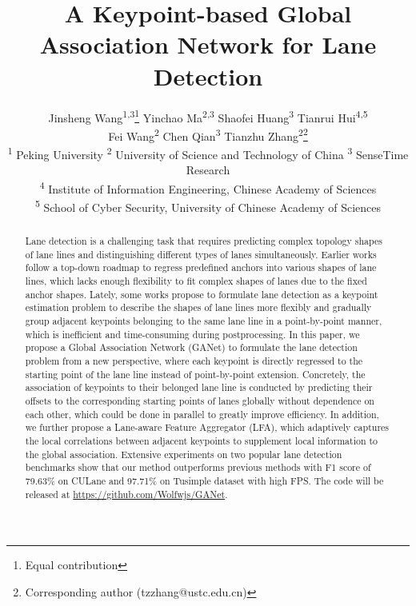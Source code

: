 \documentclass[10pt,twocolumn,letterpaper]{article}
\makeatletter
\newcommand{\printfnsymbol}[1]{\textsuperscript{\@fnsymbol{#1}}}
\makeatother
\begin{document}
\title{A Keypoint-based Global Association Network for Lane Detection}



\author{
Jinsheng Wang\textsuperscript{\rm 1,3}\thanks{Equal contribution} \quad Yinchao Ma\textsuperscript{\rm 2,3}\printfnsymbol{1} \quad Shaofei Huang\textsuperscript{\rm 3}\printfnsymbol{1} \quad Tianrui Hui\textsuperscript{\rm 4,5} \\ \quad Fei Wang\textsuperscript{\rm 2} 
\quad Chen Qian\textsuperscript{\rm3} \quad Tianzhu Zhang\textsuperscript{\rm 2}\thanks{Corresponding author (tzzhang@ustc.edu.cn)} \\
\textsuperscript{\rm 1} Peking University \quad \textsuperscript{\rm 2} University of Science and Technology of China \quad \textsuperscript{\rm 3} SenseTime Research  \\
\textsuperscript{\rm 4} Institute of Information Engineering, Chinese Academy of Sciences\\
\textsuperscript{\rm 5} School of Cyber Security, University of Chinese Academy of Sciences\\
}

\maketitle
\begin{abstract}
Lane detection is a challenging task that requires predicting complex topology shapes of lane lines and distinguishing different types of lanes simultaneously.
Earlier works follow a top-down roadmap to regress predefined anchors into various shapes of lane lines, which lacks enough flexibility to fit complex shapes of lanes due to the fixed anchor shapes.
Lately, some works propose to formulate lane detection as a keypoint estimation problem to describe the shapes of lane lines more flexibly and gradually group adjacent keypoints belonging to the same lane line in a point-by-point manner, which is inefficient and time-consuming during postprocessing.
In this paper, we propose a Global Association Network (GANet) to formulate the lane detection problem from a new perspective, where each keypoint is directly regressed to the starting point of the lane line instead of point-by-point extension.
Concretely, the association of keypoints to their belonged lane line is conducted by predicting their offsets to the corresponding starting points of lanes globally without dependence on each other, which could be done in parallel to greatly improve efficiency.
In addition, we further propose a Lane-aware Feature Aggregator (LFA), which adaptively captures the local correlations between adjacent keypoints to supplement local information to the global association.
Extensive experiments on two popular lane detection benchmarks show that our method outperforms previous methods with F1 score of 79.63\% on CULane and 97.71\% on Tusimple dataset with high FPS. The code will be released at \url{https://github.com/Wolfwjs/GANet}.
\end{abstract}
\end{document}

